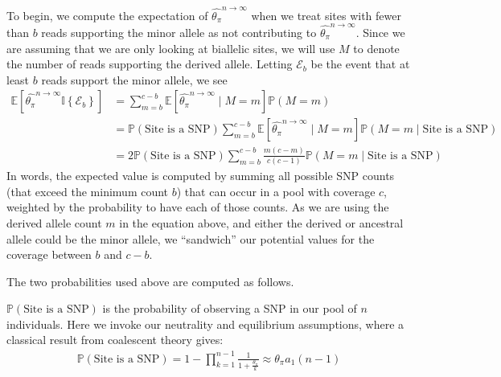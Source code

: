 \documentclass[a4paper,fontsize=9pt,DIV=14]{scrartcl}
\newcommand{\samplesize}{n}
\newcommand{\coverage}{c}
\newcommand{\thetapi}{\widehat{\theta_\pi}}
\begin{document}
To begin, we compute the expectation of $\thetapi^{\samplesize\to\infty}$ when we treat sites with fewer than $b$ reads supporting the minor allele as not contributing to $\thetapi^{\samplesize\to\infty}$.  Since we are assuming that we are only looking at biallelic sites, we will use $M$ to denote the number of reads supporting the derived allele.  Letting $\mathcal{E}_b$ be the event that at least $b$ reads support the minor allele, we see
%
\begin{align}
\mathbb{E}\left[\thetapi^{\samplesize\to\infty} \mathbb{I}\left\{\mathcal{E}_b\right\}\right] &= \sum_{m=b}^{\coverage-b} \mathbb{E}\left[\thetapi^{\samplesize\to\infty} \mid M=m \right] \mathbb{P}(M = m)\\
&= \mathbb{P}\left(\text{Site is a SNP}\right)\sum_{m=b}^{\coverage-b} \mathbb{E}\left[\thetapi^{\samplesize\to\infty} \mid M=m \right] \mathbb{P}\left(M = m \mid \text{Site is a SNP}\right)\\
&=  2\mathbb{P}\left(\text{Site is a SNP}\right)\sum_{m=b}^{\coverage-b} \frac{m(\coverage-m)}{\coverage(\coverage-1)} \mathbb{P}\left(M = m \mid \text{Site is a SNP}\right)
\label{eq:ExpectationThetaPi}
\end{align}
%
In words, the expected value is computed by summing all possible SNP counts (that exceed the minimum count $b$) that can occur in a pool with coverage $\coverage$, weighted by the probability to have each of those counts.  As we are using the derived allele count $m$ in the equation above, and either the derived or ancestral allele could be the minor allele, we ``sandwich'' our potential values for the coverage between $b$ and $\coverage-b$.

The two probabilities used above are computed as follows.

$\mathbb{P}\left(\text{Site is a SNP}\right)$ is the probability of observing a SNP in our pool of $\samplesize$ individuals.  Here we invoke our neutrality and equilibrium assumptions, where a classical result from coalescent theory gives:
%
\begin{align}
\label{eq:PSNP}
\mathbb{P}\left(\text{Site is a SNP}\right) = 1- \prod_{k=1}^{\samplesize-1} \frac{1}{1+\frac{\theta_\pi}{k}} \approx \theta_\pi a_1(n-1)
\end{align}
\end{document}
